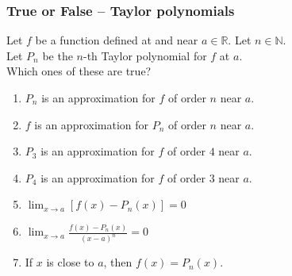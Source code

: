 \begin{frame}[t]
	\fontsize{13}{13}\selectfont
	\frametitle{True or False -- Taylor polynomials}

	Let $f$ be a function defined at and near $a \in \mathbb{R}$. Let
	$\displaystyle n \in \mathbb{N}$. \\ Let $P_{n}$ be the $n$-th Taylor polynomial
	for $f$ at $a$. \\ Which ones of these are true?

	\begin{enumerate}
		\item $P_{n}$ is an approximation for $f$ of order $n$ near $a$.
			\vfill

		\item $f$ is an approximation for $P_{n}$ of order $n$ near $a$.
			\vfill

		\item $P_{3}$ is an approximation for $f$ of order $4$ near $a$.
			\vfill

		\item $P_{4}$ is an approximation for $f$ of order $3$ near $a$.
			\vfill

		\item $\displaystyle \lim_{x \to a}\left[ f(x) - P_{n}(x) \right] = 0$
			\vfill

		\item $\displaystyle \lim_{x \to a}\frac{f(x) - P_{n}(x)}{(x-a)^{n}}= 0$
			\vfill

		\item If $x$ is close to $a$, then $f(x) = P_{n}(x)$.
			\vfill
	\end{enumerate}
\end{frame}

